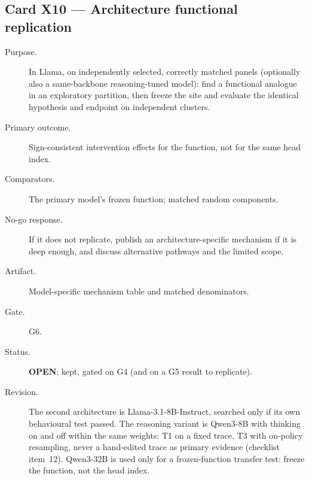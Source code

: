 \documentclass[10pt,a4paper]{article}
\begin{document}
\subsection{Card X10 --- Architecture functional replication}
\label{card:X10}
\begin{description}
\item[Purpose.] In Llama, on independently selected, correctly matched panels (optionally also a same-backbone
reasoning-tuned model): find a functional analogue in an exploratory partition, then freeze the site and evaluate
the identical hypothesis and endpoint on independent clusters.
\item[Primary outcome.] Sign-consistent intervention effects for the function, not for the same head index.
\item[Comparators.] The primary model's frozen function; matched random components.
\item[No-go response.] If it does not replicate, publish an architecture-specific mechanism if it is deep enough,
and discuss alternative pathways and the limited scope.
\item[Artifact.] Model-specific mechanism table and matched denominators.
\item[Gate.] G6.
\item[Status.] \textbf{OPEN}; kept, gated on G4 (and on a G5 result to replicate).
\item[Revision.] The second architecture is Llama-3.1-8B-Instruct, searched only if its own behavioural test
passed. The reasoning variant is Qwen3-8B with thinking on and off within the same weights: T1 on a fixed trace,
T3 with on-policy resampling, never a hand-edited trace as primary evidence (checklist item~12). Qwen3-32B is used
only for a frozen-function transfer test: freeze the function, not the head index.
\end{description}

\end{document}
